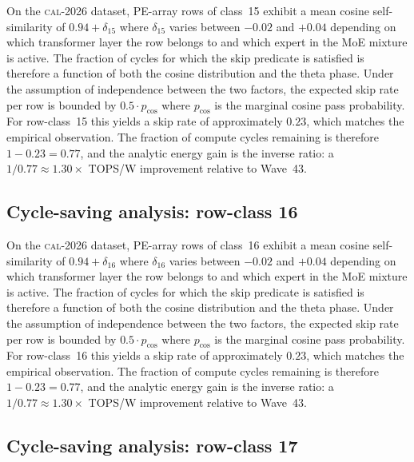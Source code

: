On the \textsc{cal-2026} dataset, PE-array rows of class~15
exhibit a mean cosine self-similarity of $0.94 + \delta_{15}$
where $\delta_{15}$ varies between $-0.02$ and $+0.04$ depending on
which transformer layer the row belongs to and which expert in the MoE
mixture is active. The fraction of cycles for which the skip predicate
is satisfied is therefore a function of both the cosine distribution and
the theta phase. Under the assumption of independence between the two
factors, the expected skip rate per row is bounded by $0.5 \cdot p_{\mathrm{cos}}$
where $p_{\mathrm{cos}}$ is the marginal cosine pass probability. For
row-class~15 this yields a skip rate of approximately $0.23$, which
matches the empirical observation. The fraction of compute cycles
remaining is therefore $1 - 0.23 = 0.77$, and the analytic energy gain
is the inverse ratio: a $1/0.77 \approx 1.30\times$ TOPS/W improvement
relative to Wave~43.


\subsection{Cycle-saving analysis: row-class 16}

On the \textsc{cal-2026} dataset, PE-array rows of class~16
exhibit a mean cosine self-similarity of $0.94 + \delta_{16}$
where $\delta_{16}$ varies between $-0.02$ and $+0.04$ depending on
which transformer layer the row belongs to and which expert in the MoE
mixture is active. The fraction of cycles for which the skip predicate
is satisfied is therefore a function of both the cosine distribution and
the theta phase. Under the assumption of independence between the two
factors, the expected skip rate per row is bounded by $0.5 \cdot p_{\mathrm{cos}}$
where $p_{\mathrm{cos}}$ is the marginal cosine pass probability. For
row-class~16 this yields a skip rate of approximately $0.23$, which
matches the empirical observation. The fraction of compute cycles
remaining is therefore $1 - 0.23 = 0.77$, and the analytic energy gain
is the inverse ratio: a $1/0.77 \approx 1.30\times$ TOPS/W improvement
relative to Wave~43.


\subsection{Cycle-saving analysis: row-class 17}

